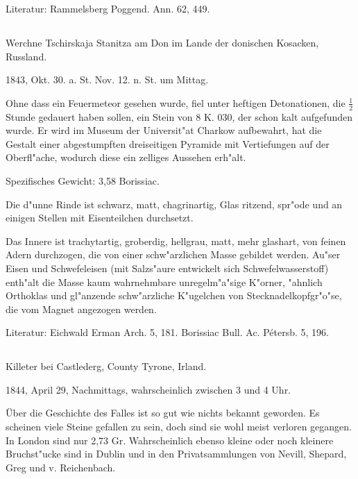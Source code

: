 \documentclass[a4paper, 11pt, oneside]{article}
\begin{document}
\normalsize
Literatur: Rammelsberg Poggend. Ann. 62, 449.

\subsection{}
\LARGE
\paragraph{}
Werchne Tschirskaja Stanitza am Don im Lande der donischen Kosacken, Russland.

1843, Okt. 30. a. St. Nov. 12. n. St. um Mittag.

Ohne dass ein Feuermeteor gesehen wurde, fiel unter heftigen Detonationen, die $\mathfrak{\frac{1}{2}}$ Stunde gedauert haben sollen, ein Stein von 8 K. 030, der schon kalt aufgefunden wurde. Er wird im Museum der Universit"at Charkow aufbewahrt, hat die Gestalt einer abgestumpften dreiseitigen Pyramide mit Vertiefungen auf der Oberfl"ache, wodurch diese ein zelliges Aussehen erh"alt.

Spezifisches Gewicht: 3,58 Borissiac.

Die d"unne Rinde ist schwarz, matt, chagrinartig, Glas ritzend, spr"ode und an einigen Stellen mit Eisenteilchen durchsetzt.

Das Innere ist trachytartig, groberdig, hellgrau, matt, mehr glashart, von feinen Adern durchzogen, die von einer schw"arzlichen Masse gebildet werden. Au"ser Eisen und Schwefeleisen (mit Salzs"aure entwickelt sich Schwefelwasserstoff) enth"alt die Masse kaum wahrnehmbare unregelm"a"sige K"orner, "ahnlich Orthoklas und gl"anzende schw"arzliche K"ugelchen von Stecknadelkopfgr"o"se, die vom Magnet angezogen werden.

\normalsize
Literatur: Eichwald Erman Arch. 5, 181. Borissiac Bull. Ac. Pétersb. 5, 196.

\subsection{}
\LARGE
\paragraph{}
Killeter bei Castlederg, County Tyrone, Irland.

1844, April 29, Nachmittags, wahrscheinlich zwischen 3 und 4 Uhr.

Über die Geschichte des Falles ist so gut wie nichts bekannt geworden. Es scheinen viele Steine gefallen zu sein, doch sind sie wohl meist verloren gegangen. In London sind nur 2,73 Gr. Wahrscheinlich ebenso kleine oder noch kleinere Bruchst"ucke sind in Dublin und in den Privatsammlungen von Nevill, Shepard, Greg und v. Reichenbach.
\end{document}
